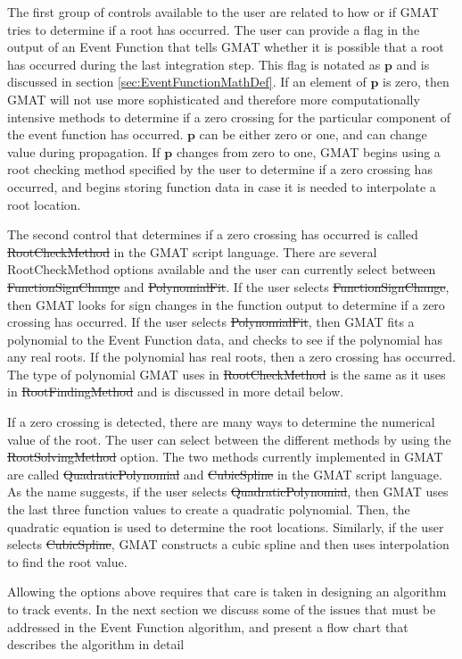 The first group of controls available to the user are related to how
or if GMAT tries to determine if a root has occurred.  The user can
provide a flag in the output of an Event Function that tells GMAT
whether it is possible that a root has occurred during the last
integration step. This flag is notated as $\mathbf{p}$ and is
discussed in section \ref{sec:EventFunctionMathDef}.  If an element
of $\mathbf{p}$ is zero, then GMAT will not use more sophisticated
and therefore more computationally intensive methods to determine if
a zero crossing for the particular component of the event function
has occurred.  $\mathbf{p}$ can be either zero or one, and can
change value during propagation.  If $\mathbf{p}$ changes from zero
to one, GMAT begins using a root checking method specified by the
user to determine if a zero crossing has occurred, and begins
storing function data  in case it is needed to interpolate a root
location.

The second control that determines if a  zero crossing has occurred
is called \st{RootCheckMethod} in the GMAT script language.  There
are several RootCheckMethod options available and the user can
currently select between \st{FunctionSignChange} and
\st{PolynomialFit}.  If the user selects \st{FunctionSignChange},
then GMAT looks for sign changes in the function output to determine
if a zero crossing has occurred.  If the user selects
\st{PolynomialFit}, then GMAT fits a polynomial to the Event
Function data, and checks to see if the polynomial has any real
roots. If the polynomial has real roots, then a zero crossing has
occurred. The type of polynomial GMAT uses in \st{RootCheckMethod}
is the same as it uses in \st{RootFindingMethod} and is discussed in
more detail below.

If a zero crossing is detected, there are many ways to determine the
numerical value of the root.  The user can select between the
different methods by using the \st{RootSolvingMethod} option. The
two methods currently implemented in GMAT are called
\st{QuadraticPolynomial} and \st{CubicSpline} in the GMAT script
language.  As the name suggests, if the user selects
\st{QuadraticPolynomial}, then GMAT uses the last three function
values to create a quadratic polynomial.  Then, the quadratic
equation is used to determine the root locations. Similarly, if the
user selects \st{CubicSpline}, GMAT constructs a cubic spline and
then uses interpolation to find the root value.

Allowing the options above requires that care is taken in designing
an algorithm to track events.  In the next section we discuss some
of the issues that must be addressed in the Event Function
algorithm, and present a flow chart that describes the algorithm in
detail

